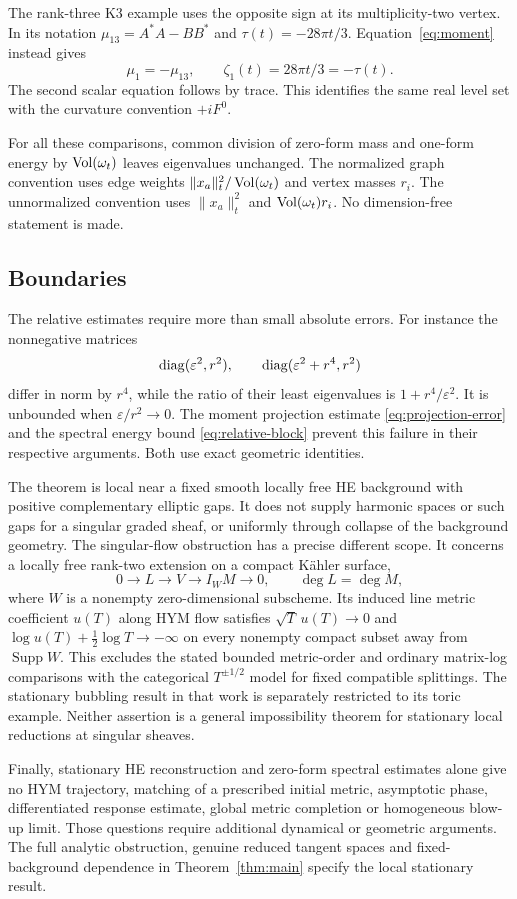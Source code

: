 The rank-three K3 example uses the opposite sign at its
multiplicity-two vertex. In its notation
$\mu_{13}=A^*A-BB^*$ and $\tau(t)=-28\pi t/3$.
Equation~\eqref{eq:moment} instead gives
\[
 \mu_1=-\mu_{13},\qquad \zeta_1(t)=28\pi t/3=-\tau(t).
\]
The second scalar equation follows by trace. This identifies the
same real level set with the curvature convention $+iF^0$.

For all these comparisons, common division of zero-form mass and
one-form energy by $\operatorname{Vol}(\omega_t)$ leaves eigenvalues unchanged.
The normalized graph convention uses edge weights
$\|x_a\|_t^2/\operatorname{Vol}(\omega_t)$ and vertex masses $r_i$.
The unnormalized convention uses $\|x_a\|_t^2$ and
$\operatorname{Vol}(\omega_t)r_i$. No dimension-free statement is made.

\subsection{Boundaries}
The relative estimates require more than small absolute errors.
For instance the nonnegative matrices
\[
 \operatorname{diag}(\varepsilon^2,r^2),\qquad
 \operatorname{diag}(\varepsilon^2+r^4,r^2)
\]
differ in norm by $r^4$, while the ratio of their least eigenvalues
is $1+r^4/\varepsilon^2$. It is unbounded when
$\varepsilon/r^2\to0$. The moment projection estimate
\eqref{eq:projection-error} and the spectral energy bound
\eqref{eq:relative-block} prevent this failure in their respective
arguments. Both use exact geometric identities.

The theorem is local near a fixed smooth locally free HE
background with positive complementary elliptic gaps.
It does not supply harmonic spaces or such gaps for a singular
graded sheaf, or uniformly through collapse of the background
geometry. The singular-flow obstruction
\cite[Theorem~1.1 and Corollary~1.2]{wuebben10}
has a precise different scope. It concerns a locally free rank-two
extension on a compact K\"ahler surface,
\[
 0\longrightarrow L\longrightarrow V\longrightarrow I_WM
                    \longrightarrow0,\qquad
 \deg L=\deg M,
\]
where $W$ is a nonempty zero-dimensional subscheme.
Its induced line metric coefficient $u(T)$ along HYM flow
satisfies $\sqrt T\,u(T)\to0$ and
$\log u(T)+\tfrac12\log T\to-\infty$ on every nonempty compact
subset away from $\operatorname{Supp}W$.
This excludes the stated bounded metric-order and ordinary
matrix-log comparisons with the categorical $T^{\pm1/2}$ model
for fixed compatible splittings. The stationary bubbling result
in that work is separately restricted to its toric example.
Neither assertion is a general impossibility theorem for
stationary local reductions at singular sheaves.

Finally, stationary HE reconstruction and zero-form spectral
estimates alone give no HYM trajectory, matching of a prescribed
initial metric, asymptotic phase, differentiated response estimate,
global metric completion or homogeneous blow-up limit.
Those questions require additional dynamical or geometric
arguments. The full analytic obstruction, genuine reduced
tangent spaces and fixed-background dependence in
Theorem~\ref{thm:main} specify the local stationary result.

